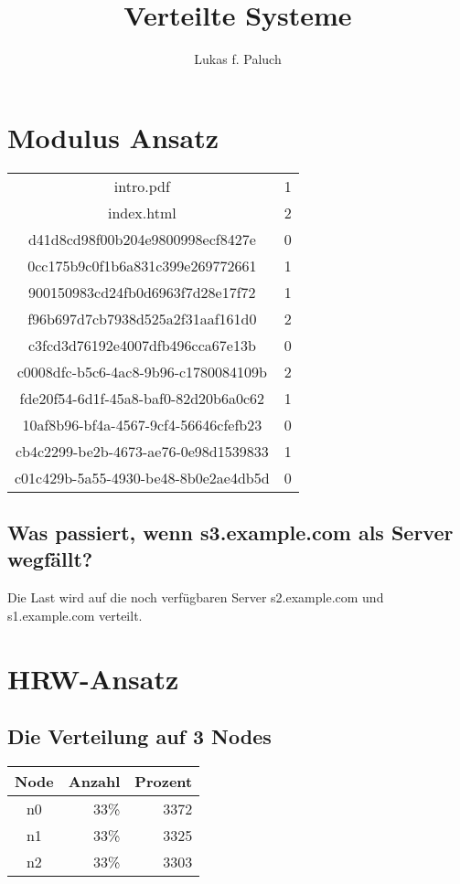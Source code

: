 \documentclass[12pt,a4paper]{report}
\title{Verteilte Systeme}
\author{Lukas f. Paluch}
\date{}
\begin{document}
	\section{Modulus Ansatz}

		\begin{tabular}{|c|c|}
			intro.pdf & 1\\
			index.html & 2\\
			d41d8cd98f00b204e9800998ecf8427e & 0\\
			0cc175b9c0f1b6a831c399e269772661 & 1\\
			900150983cd24fb0d6963f7d28e17f72 & 1\\
			f96b697d7cb7938d525a2f31aaf161d0 & 2\\
			c3fcd3d76192e4007dfb496cca67e13b & 0\\
			c0008dfc-b5c6-4ac8-9b96-c1780084109b & 2\\
			fde20f54-6d1f-45a8-baf0-82d20b6a0c62 & 1\\
			10af8b96-bf4a-4567-9cf4-56646cfefb23 & 0\\
			cb4c2299-be2b-4673-ae76-0e98d1539833 & 1\\
			c01c429b-5a55-4930-be48-8b0e2ae4db5d & 0\\
		\end{tabular}

		\subsection{Was passiert, wenn s3.example.com als Server wegfällt?}

			Die Last wird auf die noch verfügbaren Server s2.example.com und s1.example.com verteilt.

	\section{HRW-Ansatz}

		\subsection{Die Verteilung auf 3 Nodes}

		\begin{tabular}{|c|r|r|}
			Node & Anzahl & Prozent \\ \midrule
			n0 & 33\% & 3372 \\ \hline
			n1 & 33\% & 3325 \\ \hline
			n2 & 33\% & 3303 \\ \hline
		\end{tabular}
\end{document}
